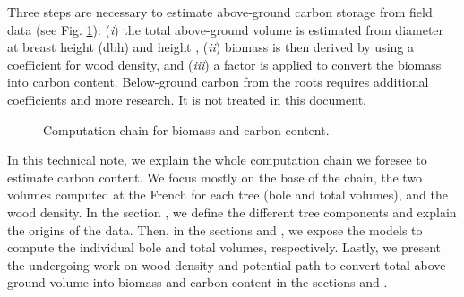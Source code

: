 Three steps are necessary to estimate above-ground carbon storage from field data (see Fig. \ref{fig::scheme}): (\textit{i}) the total above-ground volume is estimated from diameter at breast height (dbh) and height \parencite{Vallet2006}, (\textit{ii}) biomass is then derived by using a coefficient for wood density, and (\textit{iii}) a factor is applied to convert the biomass into carbon content. Below-ground carbon from the roots requires additional coefficients and more research. It is not treated in this document. \\

\begin{figure}[h]
    \centering
	
	\caption{Computation chain for biomass and carbon content.\label{fig::scheme}}
\end{figure}

In this technical note, we explain the whole computation chain we foresee to estimate carbon content. We focus mostly on the base of the chain, \ie the two volumes computed at the French \NFI{} for each tree (bole and total volumes), and the wood density. In the section , we define the different tree components and explain the origins of the data. Then, in the sections  and , we expose the models to compute the individual bole and total volumes, respectively. Lastly, we present the undergoing work on wood density and potential path to convert total above-ground volume into biomass and carbon content in the sections  and .

